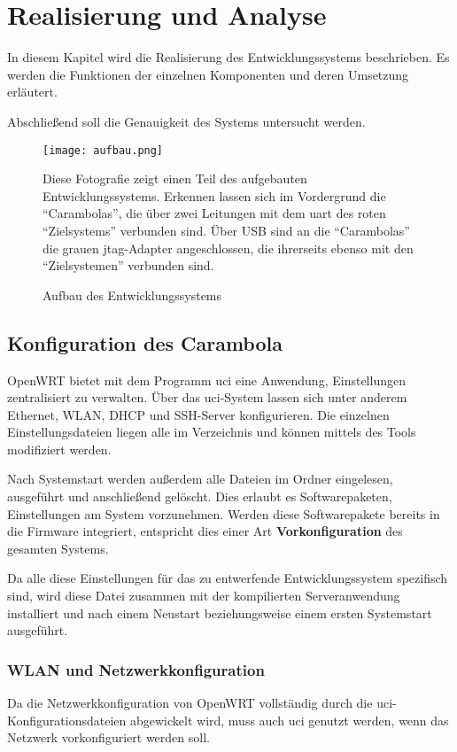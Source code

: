 \chapter{Realisierung und Analyse}\label{chap:realisierung}
\minitoc
In diesem Kapitel wird die Realisierung des Entwicklungssystems
beschrieben. Es werden die Funktionen der einzelnen Komponenten und deren
Umsetzung erläutert.

Abschließend soll die Genauigkeit des Systems untersucht werden. 
\begin{figure}[!ht]
\centering
\texttt{[image: aufbau.png]}
\caption{Aufbau des Entwicklungssystems}{Diese Fotografie zeigt einen
Teil des aufgebauten Entwicklungssystems. Erkennen lassen sich im
Vordergrund die "`Carambolas"', die über zwei Leitungen mit dem \gls{uart} des
roten "`Zielsystems"' verbunden sind. Über USB sind an die "`Carambolas"' die
grauen \gls{jtag}-Adapter angeschlossen, die ihrerseits ebenso mit den
"`Zielsystemen"' verbunden sind.}
\label{fig:aufbau}
\end{figure}
\section{Konfiguration des Carambola}\label{sec:conf}
OpenWRT bietet mit dem Programm \gls{uci} eine Anwendung, Einstellungen
zentralisiert zu verwalten. Über das \gls{uci}-System lassen sich unter anderem
Ethernet, WLAN, DHCP und SSH-Server konfigurieren. Die einzelnen
Einstellungsdateien liegen alle im Verzeichnis  und
können mittels des Tools modifiziert werden.

Nach Systemstart werden außerdem alle Dateien im Ordner
 eingelesen, ausgeführt und anschließend gelöscht.
Dies erlaubt es Softwarepaketen, Einstellungen am System vorzunehmen. Werden
diese Softwarepakete bereits in die Firmware integriert, entspricht dies einer
Art \textbf{Vorkonfiguration} des gesamten Systems.

Da alle diese Einstellungen für das zu entwerfende Entwicklungssystem spezifisch
sind, wird diese Datei zusammen mit der kompilierten Serveranwendung installiert
und nach einem Neustart beziehungsweise einem ersten Systemstart ausgeführt.
\subsection{WLAN und Netzwerkkonfiguration}
Da die Netzwerkkonfiguration von OpenWRT vollständig durch die
\gls{uci}-Konfigurationsdateien abgewickelt wird, muss auch \gls{uci} genutzt
werden, wenn das Netzwerk vorkonfiguriert werden soll.

